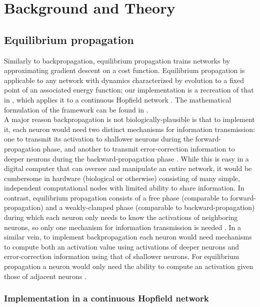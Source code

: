 \documentclass[utf8]{frontiersSCNS}
\newcommand{\npar}{\\\indent}
\begin{document}
\section{Background and Theory}

\subsection{Equilibrium propagation}
\label{sec:eqp_formulation}

Similarly to backpropagation, equilibrium propagation \cite{scellier17} trains networks by approximating gradient descent on a cost function. Equilibrium propagation is applicable to any network with dynamics characterized by evolution to a fixed point of an associated energy function; our implementation is a recreation of that in \cite{scellier17}, which applies it to a continuous Hopfield network \cite{hopfield1984}. The mathematical formulation of the framework can be found in \cite{scellier17}.
\npar
A major reason backpropagation is not biologically-plausible is that to implement it, each neuron would need two distinct mechanisms for information transmission: one to transmit its activation to shallower neurons during the forward-propagation phase, and another to transmit error-correction information to deeper neurons during the backward-propagation phase \cite{bengio2015}. While this is easy in a digital computer that can oversee and manipulate an entire network, it would be cumbersome in hardware (biological or otherwise) consisting of many simple, independent computational nodes with limited ability to share information. In contrast, equilibrium propagation consists of a free phase (comparable to forward-propagation) and a weakly-clamped phase (comparable to backward-propagation) during which each neuron only needs to know the activations of neighboring neurons, so only one mechanism for information transmission is needed \cite{scellier17}. In a similar vein, to implement backpropagation each neuron would need mechanisms to compute both an activation value using activations of deeper neurons and error-correction information using that of shallower neurons. For equilibrium propagation a neuron would only need the ability to compute an activation given those of adjacent neurons \cite{scellier17}.

\subsubsection{Implementation in a continuous Hopfield network}
\end{document}
